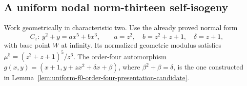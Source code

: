 \subsection{A uniform nodal norm-thirteen self-isogeny}
\label{subsec:uniform-thirteen-theta-candidate}

Work geometrically in characteristic two. Use the already proved normal form
\[
 C_z:\ y^2+y=ax^5+bx^3,\qquad
 a=z^2,\quad b=z^2+z+1,\quad \delta=z+1,
\]
with base point $W$ at infinity. Its normalized geometric modulus satisfies
$\mu^5=(z^2+z+1)^5/z^6$. The order-four automorphism
$g(x,y)=(x+1,y+zx^2+\delta x+\beta)$, where
$\beta^2+\beta=\delta$, is the one constructed in
Lemma~\ref{lem:uniform-f0-order-four-presentation-candidate}.

